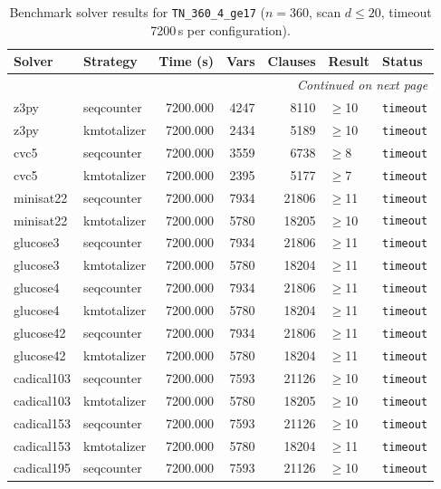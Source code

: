 \begin{longtable}{llrrrl p{}}
\caption{Benchmark solver results for \texttt{TN\_360\_4\_ge17} ($n=360$, scan $d \leq 20$, timeout 7200\,s per configuration).} \label{tab:bench-TN_360_4_ge17} \\
\toprule
Solver & Strategy & Time (s) & Vars & Clauses & Result & Status \\
\midrule
\endhead
\midrule
\multicolumn{7}{r}{\textit{Continued on next page}} \\
\midrule
\endfoot
\bottomrule
\endlastfoot
z3py & seqcounter & 7200.000 & 4247 & 8110 & $\geq$10 & \texttt{timeout} \\
z3py & kmtotalizer & 7200.000 & 2434 & 5189 & $\geq$10 & \texttt{timeout} \\
cvc5 & seqcounter & 7200.000 & 3559 & 6738 & $\geq$8 & \texttt{timeout} \\
cvc5 & kmtotalizer & 7200.000 & 2395 & 5177 & $\geq$7 & \texttt{timeout} \\
minisat22 & seqcounter & 7200.000 & 7934 & 21806 & $\geq$11 & \texttt{timeout} \\
minisat22 & kmtotalizer & 7200.000 & 5780 & 18205 & $\geq$10 & \texttt{timeout} \\
glucose3 & seqcounter & 7200.000 & 7934 & 21806 & $\geq$11 & \texttt{timeout} \\
glucose3 & kmtotalizer & 7200.000 & 5780 & 18204 & $\geq$11 & \texttt{timeout} \\
glucose4 & seqcounter & 7200.000 & 7934 & 21806 & $\geq$11 & \texttt{timeout} \\
glucose4 & kmtotalizer & 7200.000 & 5780 & 18204 & $\geq$11 & \texttt{timeout} \\
glucose42 & seqcounter & 7200.000 & 7934 & 21806 & $\geq$11 & \texttt{timeout} \\
glucose42 & kmtotalizer & 7200.000 & 5780 & 18204 & $\geq$11 & \texttt{timeout} \\
cadical103 & seqcounter & 7200.000 & 7593 & 21126 & $\geq$10 & \texttt{timeout} \\
cadical103 & kmtotalizer & 7200.000 & 5780 & 18205 & $\geq$10 & \texttt{timeout} \\
cadical153 & seqcounter & 7200.000 & 7593 & 21126 & $\geq$10 & \texttt{timeout} \\
cadical153 & kmtotalizer & 7200.000 & 5780 & 18204 & $\geq$11 & \texttt{timeout} \\
cadical195 & seqcounter & 7200.000 & 7593 & 21126 & $\geq$10 & \texttt{timeout} \\

\end{longtable}
